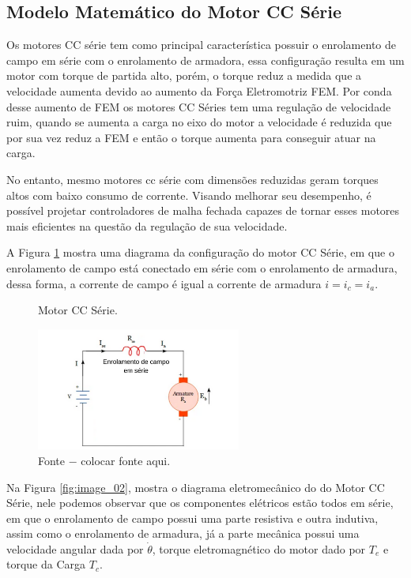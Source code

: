 \subsection{Modelo Matemático do Motor CC Série}

Os motores CC série tem como principal característica possuir o enrolamento de campo em série com o enrolamento de armadora, essa configuração resulta em um motor com torque de partida alto, porém, o torque reduz a medida que a velocidade aumenta devido ao aumento da Força Eletromotriz FEM. Por conda desse aumento de FEM os motores CC Séries tem uma regulação de velocidade ruim, quando se aumenta a carga no eixo do motor a velocidade é reduzida que por sua vez reduz a FEM e então o torque aumenta para conseguir atuar na carga.

No entanto, mesmo motores cc série com dimensões reduzidas geram torques altos com baixo consumo de corrente. Visando melhorar seu desempenho, é possível projetar controladores de malha fechada capazes de tornar esses motores mais eficientes na questão da regulação de sua velocidade.

A Figura \ref{fig:image_01} mostra uma diagrama da configuração do motor CC Série, em que o enrolamento de campo está conectado em série com o enrolamento de armadura, dessa forma, a  corrente de campo é igual a corrente de armadura $ i = i_c = i_a$.


\begin{figure}[h]
	\centering
	\caption{Motor CC Série.}
	\includegraphics[width=0.6\textwidth]{Capitulos/4_desenvolvimento/4_figuras/esquema_motorcc.png}
	\caption*{Fonte $-$ colocar fonte aqui.}
	\label{fig:image_01}
\end{figure}

Na Figura \ref{fig:image_02}, mostra o diagrama eletromecânico do do Motor CC Série, nele podemos observar que os componentes elétricos estão todos em série, em que o enrolamento de campo possui uma parte resistiva e outra indutiva, assim como o enrolamento de armadura, já a parte mecânica possui uma velocidade angular dada por $\dot{\theta}$, torque eletromagnético do motor dado por $T_e$ e torque da Carga $T_c$.

